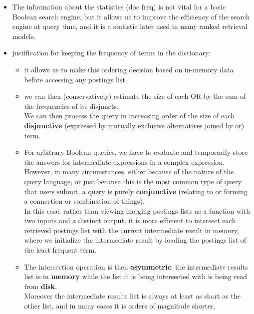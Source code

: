 \begin{itemize}
    \item The information about the statistics (doc freq) is not vital for a basic Boolean search engine, but it allows us to improve the efficiency of the search engine at query time, and it is a statistic later used in many ranked retrieval models.

    \item justification for keeping the frequency of terms in the dictionary:
    \begin{itemize}
        \item it allows us to make this ordering decision based on in-memory data before accessing any postings list.

        \item we can then (conservatively) estimate the size of each OR by the sum of the frequencies of its disjuncts.\\
        We can then process the query in increasing order of the size of each \textbf{disjunctive} (expressed by mutually exclusive alternatives joined by or) term.

        \item For arbitrary Boolean queries, we have to evaluate and temporarily store the answers for intermediate expressions in a complex expression. \\
        However, in many circumstances, either because of the nature of the query language, or just because this is the most common type of query that users submit, a query is purely \textbf{conjunctive} (relating to or forming a connection or combination of things).\\
        In this case, rather than viewing merging postings lists as a function with two inputs and a distinct output, it is more efficient to intersect each retrieved postings list with the current intermediate result in memory, where we initialize the intermediate result by loading the postings list of the least frequent term.

        \item The intersection operation is then \textbf{asymmetric}: the intermediate results list is in \textbf{memory} while the list it is being intersected with is being read from \textbf{disk}.\\
        Moreover the intermediate results list is always at least as short as the other list, and in many cases it is orders of magnitude shorter.
    \end{itemize}
\end{itemize}


